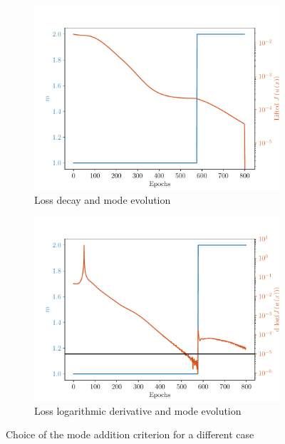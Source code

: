 \begin{figure}
	\begin{subfigure}[t]{0.5\linewidth}
		\centering
		\includegraphics[width=\linewidth]{Figures/Loss_Modes_Bi_800.pdf}
		\caption{Loss decay and mode evolution}
	\end{subfigure}
	\begin{subfigure}[t]{0.5\linewidth}
		\centering
		\includegraphics[width=\linewidth]{Figures/LossDecay_Modes_Bi_800.pdf}
		\caption{Loss logarithmic derivative and mode evolution}
	\end{subfigure}  
	\caption{Choice of the mode addition criterion for a different case}
	\label{fig:Criterion_mode2}
\end{figure}


